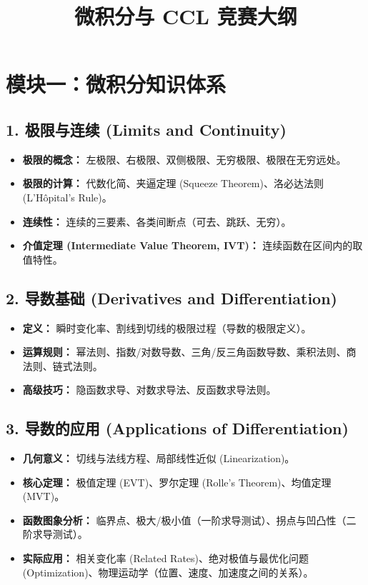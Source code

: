 \documentclass[12pt,a4paper]{article}
\title{\textbf{微积分与 CCL 竞赛大纲}}
\author{}
\date{}
\begin{document}
\maketitle

\section*{模块一：微积分知识体系 }

\subsection*{1. 极限与连续 (Limits and Continuity)}
\begin{itemize}
    \item \textbf{极限的概念：} 左极限、右极限、双侧极限、无穷极限、极限在无穷远处。
    \item \textbf{极限的计算：} 代数化简、夹逼定理 (Squeeze Theorem)、洛必达法则 (L'H\^opital's Rule)。
    \item \textbf{连续性：} 连续的三要素、各类间断点（可去、跳跃、无穷）。
    \item \textbf{介值定理 (Intermediate Value Theorem, IVT)：} 连续函数在区间内的取值特性。
\end{itemize}

\subsection*{2. 导数基础 (Derivatives and Differentiation)}
\begin{itemize}
    \item \textbf{定义：} 瞬时变化率、割线到切线的极限过程（导数的极限定义）。
    \item \textbf{运算规则：} 幂法则、指数/对数导数、三角/反三角函数导数、乘积法则、商法则、链式法则。
    \item \textbf{高级技巧：} 隐函数求导、对数求导法、反函数求导法则。
\end{itemize}

\subsection*{3. 导数的应用 (Applications of Differentiation)}
\begin{itemize}
    \item \textbf{几何意义：} 切线与法线方程、局部线性近似 (Linearization)。
    \item \textbf{核心定理：} 极值定理 (EVT)、罗尔定理 (Rolle's Theorem)、均值定理 (MVT)。
    \item \textbf{函数图象分析：} 临界点、极大/极小值（一阶求导测试）、拐点与凹凸性（二阶求导测试）。
    \item \textbf{实际应用：} 相关变化率 (Related Rates)、绝对极值与最优化问题 (Optimization)、物理运动学（位置、速度、加速度之间的关系）。
\end{itemize}
\end{document}
